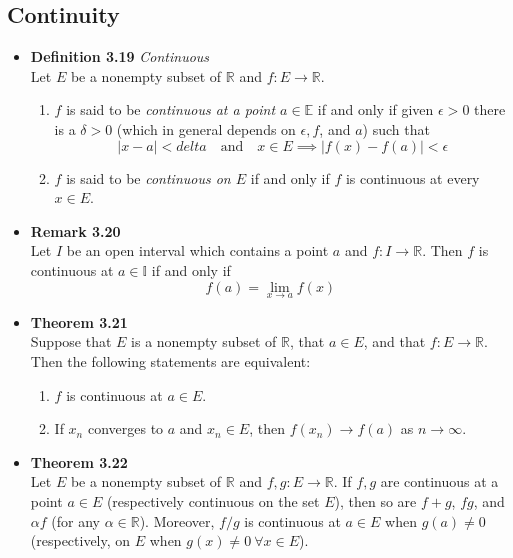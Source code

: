 \documentclass[11pt,a4paper]{article}
\begin{document}
\subsection{Continuity}

\begin{itemize}
    \item \textbf{Definition 3.19} \emph{Continuous} \\
        Let $E$ be a nonempty subset of $\mathbb{R}$ and $f : E \to \mathbb{R}$.
        \begin{enumerate}
            \item $f$ is said to be \emph{continuous at a point $a \in \mathbb{E}$} if and only
                if given $\epsilon > 0$ there is a $\delta > 0$
                (which in general depends on $\epsilon, f$, and $a$) such that
                \[
                    |x-a| < delta \quad \text{and} \quad x \in E \implies
                    |f(x) - f(a)| < \epsilon
                \]

            \item $f$ is said to be \emph{continuous on $E$} if and only if $f$ is continuous
                at every $x \in E$.
        \end{enumerate}
    \item \textbf{Remark 3.20} \\
        Let $I$ be an open interval which contains a point $a$ and $f : I \to \mathbb{R}$.
        Then $f$ is continuous at $a \in \mathbb{I}$ if and only if
        \[
            f(a) = \lim_{x \to a} f(x)
        \]

    \item \textbf{Theorem 3.21} \\
        Suppose that $E$ is a nonempty subset of $\mathbb{R}$, that $a \in E$, and that
        $f : E \to \mathbb{R}$.
        Then the following statements are equivalent:
        \begin{enumerate}
            \item $f$ is continuous at $a \in E$.
            \item If $x_n$ converges to $a$ and $x_n \in E$, then
                $f(x_n) \to f(a)$ as $n \to \infty$.
        \end{enumerate}

    \item \textbf{Theorem 3.22} \\
        Let $E$ be a nonempty subset of $\mathbb{R}$ and $f, g : E \to \mathbb{R}$.
        If $f, g$ are continuous at a point $a \in E$ (respectively continuous on the set $E$),
        then so are $f+g$, $fg$, and $\alpha f$ (for any $\alpha \in \mathbb{R}$).
        Moreover, $f/g$ is continuous at $a \in E$ when $g(a) \neq 0$
        (respectively, on $E$ when $g(x) \neq 0\ \forall x \in E$).


\end{itemize}
\end{document}
